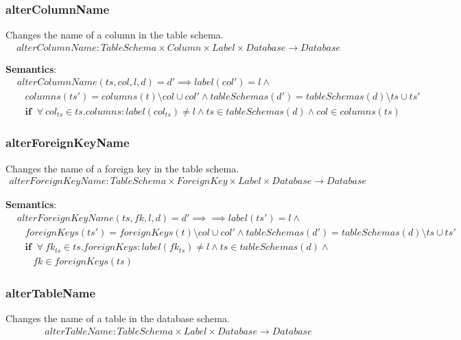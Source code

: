 \documentclass[10pt]{article}
\begin{document}
\subsubsection{alterColumnName}
Changes the name of a column in the table schema.
\begin{align}
alterColumnName: TableSchema \times Column \times Label \times Database \rightarrow Database
\end{align}

\noindent \textbf{Semantics}:
\begin{align}
& alterColumnName(ts, col, l, d) = d' \implies label(col') = l \land \nonumber \\
& \;\;\; columns(ts') = columns(t) \setminus col \cup col' \land tableSchemas(d') = tableSchemas(d) \setminus ts \cup ts'  \nonumber \\
& \;\;\; \mathbf{if}  \;\;  \forall \: col_{ts} \in ts.columns : label(col_{ts}) \neq l \land ts \in tableSchemas(d) \land col \in columns(ts) 
\end{align}

\subsubsection{alterForeignKeyName}
Changes the name of a foreign key in the table schema.
\begin{align}
alterForeignKeyName: TableSchema \times ForeignKey \times Label \times Database \rightarrow Database
\end{align}

\noindent \textbf{Semantics}:
\begin{align}
& alterForeignKeyName(ts, fk, l, d) = d' \implies \implies label(ts') = l \land \nonumber \\
& \;\;\; foreignKeys(ts') = foreignKeys(t) \setminus col \cup col' \land tableSchemas(d') = tableSchemas(d) \setminus ts \cup ts'  \nonumber \\
& \;\;\; \mathbf{if}  \;\;  \forall \: fk_{ts} \in ts.foreignKeys : label(fk_{ts}) \neq l \land ts \in tableSchemas(d) \land \nonumber \\
& \;\;\;\;\;\; fk \in foreignKeys(ts) 
\end{align}

\subsubsection{alterTableName}
Changes the name of a table in the database schema.
\begin{align}
alterTableName: TableSchema \times Label \times Database \rightarrow Database
\end{align}
\end{document}
